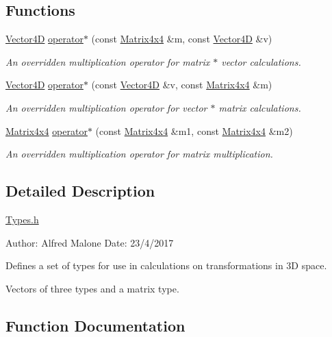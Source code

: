 \subsection*{Functions}
\begin{DoxyCompactItemize}
\item 
\hyperlink{structtypes_1_1_vector4_d}{Vector4\+D} \hyperlink{namespacetypes_ac99fc0911ec065e97201c1c76d4cf2ba}{operator$\ast$} (const \hyperlink{structtypes_1_1_matrix4x4}{Matrix4x4} \&m, const \hyperlink{structtypes_1_1_vector4_d}{Vector4\+D} \&v)
\begin{DoxyCompactList}\small\item\em An overridden multiplication operator for matrix $\ast$ vector calculations. \end{DoxyCompactList}\item 
\hyperlink{structtypes_1_1_vector4_d}{Vector4\+D} \hyperlink{namespacetypes_a27447503d55a883398ca0d4f508cccd5}{operator$\ast$} (const \hyperlink{structtypes_1_1_vector4_d}{Vector4\+D} \&v, const \hyperlink{structtypes_1_1_matrix4x4}{Matrix4x4} \&m)
\begin{DoxyCompactList}\small\item\em An overridden multiplication operator for vector $\ast$ matrix calculations. \end{DoxyCompactList}\item 
\hyperlink{structtypes_1_1_matrix4x4}{Matrix4x4} \hyperlink{namespacetypes_a45f7e10e6d67b2b7a61988bdec802f7f}{operator$\ast$} (const \hyperlink{structtypes_1_1_matrix4x4}{Matrix4x4} \&m1, const \hyperlink{structtypes_1_1_matrix4x4}{Matrix4x4} \&m2)
\begin{DoxyCompactList}\small\item\em An overridden multiplication operator for matrix multiplication. \end{DoxyCompactList}\end{DoxyCompactItemize}


\subsection{Detailed Description}
\hyperlink{_types_8h}{Types.\+h}

Author\+: Alfred Malone Date\+: 23/4/2017

Defines a set of types for use in calculations on transformations in 3\+D space.

Vectors of three types and a matrix type. 

\subsection{Function Documentation}
\hypertarget{namespacetypes_ac99fc0911ec065e97201c1c76d4cf2ba}{}
